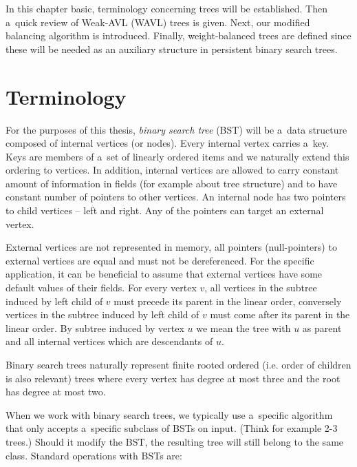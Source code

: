 In this chapter basic, terminology concerning trees will be established. Then a~quick review of Weak-AVL (WAVL) trees is given. Next, our modified balancing algorithm is introduced. Finally, weight-balanced trees are defined since these will be needed as an auxiliary structure in persistent binary search trees.

\section{Terminology}

For the purposes of this thesis, \emph{binary search tree} (BST) will be a~data structure composed of internal vertices (or nodes). Every internal vertex carries a~key. Keys are members of a~set of linearly ordered items and we naturally extend this ordering to vertices. In addition, internal vertices are allowed to carry constant amount of information in fields (for example about tree structure) and to have constant number of pointers to other vertices. An internal node has two pointers to child vertices -- left and right. Any of the pointers can target an external vertex. 

External vertices are not represented in memory, all pointers (null-pointers) to external vertices are equal and must not be dereferenced. For the specific application, it can be beneficial to assume that external vertices have some default values of their fields. For every vertex $v$, all vertices in the subtree induced by left child of $v$ must precede its parent in the linear order, conversely vertices in the subtree induced by left child of $v$ must come after its parent in the linear order. By subtree induced by vertex $u$ we mean the tree with $u$ as parent and all internal vertices which are descendants of $u$.

Binary search trees naturally represent finite rooted ordered (i.e. order of children is also relevant) trees where every vertex has degree at most three and the root has degree at most two.

When we work with binary search trees, we typically use a~specific algorithm that only accepts a~specific subclass of BSTs on input. (Think for example 2-3 trees.) Should it modify the BST, the resulting tree will still belong to the same class. Standard operations with BSTs are:

